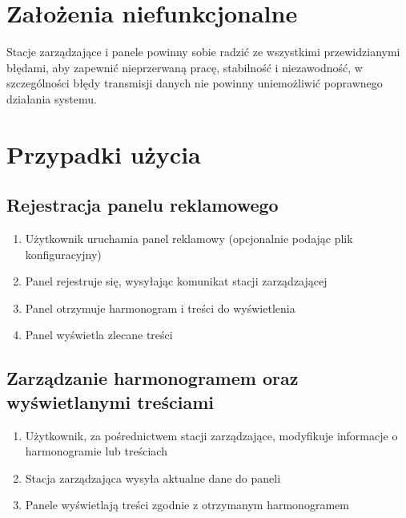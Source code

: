 \documentclass[12pt, a4paper]{article}
\providecommand{\tightlist}{%
  \setlength{\itemsep}{0pt}\setlength{\parskip}{0pt}}
\begin{document}
\hypertarget{zaux142oux17cenia-niefunkcjonalne}{%
\section{Założenia niefunkcjonalne}\label{zaux142oux17cenia-niefunkcjonalne}}

Stacje zarządzające i panele powinny sobie radzić ze wszystkimi
przewidzianymi błędami, aby zapewnić nieprzerwaną pracę, stabilność i
niezawodność, w szczególności błędy transmisji danych nie powinny
uniemożliwić poprawnego działania systemu.

\hypertarget{przypadki-uux17cycia}{%
\section{Przypadki użycia}\label{przypadki-uux17cycia}}

\hypertarget{rejestracja-panelu-reklamowego}{%
\subsection{Rejestracja panelu reklamowego}\label{rejestracja-panelu-reklamowego}}

\begin{enumerate}
\def\labelenumi{\arabic{enumi}.}
\tightlist
\item
  Użytkownik uruchamia panel reklamowy (opcjonalnie podając plik
  konfiguracyjny)
\item
  Panel rejestruje się, wysyłając komunikat stacji zarządzającej
\item
  Panel otrzymuje harmonogram i treści do wyświetlenia
\item
  Panel wyświetla zlecane treści
\end{enumerate}

\hypertarget{zarzux105dzanie-harmonogramem-oraz-wyux15bwietlanymi-treux15bciami}{%
\subsection{Zarządzanie harmonogramem oraz wyświetlanymi treściami}\label{zarzux105dzanie-harmonogramem-oraz-wyux15bwietlanymi-treux15bciami}}

\begin{enumerate}
\def\labelenumi{\arabic{enumi}.}
\tightlist
\item
  Użytkownik, za pośrednictwem stacji zarządzające, modyfikuje
  informacje o harmonogramie lub treściach
\item
  Stacja zarządzająca wysyła aktualne dane do paneli
\item
  Panele wyświetlają treści zgodnie z otrzymanym harmonogramem
\end{enumerate}
\end{document}
